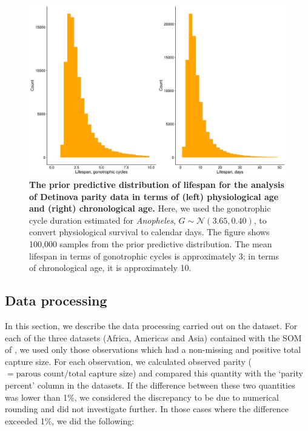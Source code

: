 \documentclass[12pt]{article}
\begin{document}
{\begin{figure}[ht]
	\centerline{\includegraphics[width=1\textwidth]{./Figure_files/detinova_prior_predictive.pdf}}
	\caption{\textbf{The prior predictive distribution of lifespan for the analysis of Detinova parity data in terms of (left) physiological age and (right) chronological age.} Here, we used the gonotrophic cycle duration estimated for \textit{Anopheles}, $G\sim \mathcal{N}(3.65, 0.40)$, to convert physiological survival to calendar days. The figure shows 100,000 samples from the prior predictive distribution. The mean lifespan in terms of gonotrophic cycles is approximately 3; in terms of chronological age, it is approximately 10.}\label{fig:detinova_priors}
\end{figure}


\subsection{Data processing}
In this section, we describe the data processing carried out on the \cite{massey2016global} dataset. For each of the three datasets (Africa, Americas and Asia) contained with the SOM of \cite{massey2016global}, we used only those observations which had a non-missing and positive total capture size. For each observation, we calculated observed parity ($=\text{parous count}/ \text{total capture size}$) and compared this quantity with the `parity percent' column in the datasets. If the difference between these two quantities was lower than 1\%, we considered the discrepancy to be due to numerical rounding and did not investigate further. In those cases where the difference exceeded 1\%, we did the following:

}
\end{document}
